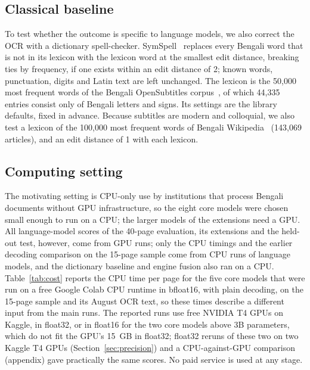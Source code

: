 \documentclass[conference]{IEEEtran}
\begin{document}




\subsection{Classical baseline}
To test whether the outcome is specific to language models, we also correct the OCR with a dictionary spell-checker. SymSpell~\cite{garbe2025symspell} replaces every Bengali word that is not in its lexicon with the lexicon word at the smallest edit distance, breaking ties by frequency, if one exists within an edit distance of 2; known words, punctuation, digits and Latin text are left unchanged. The lexicon is the 50{,}000 most frequent words of the Bengali OpenSubtitles corpus~\cite{dave2018frequencywords}, of which 44{,}335 entries consist only of Bengali letters and signs. Its settings are the library defaults, fixed in advance. Because subtitles are modern and colloquial, we also test a lexicon of the 100{,}000 most frequent words of Bengali Wikipedia~\cite{wikimedia2023wikipedia} (143{,}069 articles), and an edit distance of 1 with each lexicon.

\subsection{Computing setting}
\label{sec:computing}
The motivating setting is CPU-only use by institutions that process Bengali documents without GPU infrastructure, so the eight core models were chosen small enough to run on a CPU; the larger models of the extensions need a GPU. All language-model scores of the 40-page evaluation, its extensions and the held-out test, however, come from GPU runs; only the CPU timings and the earlier decoding comparison on the 15-page sample come from CPU runs of language models, and the dictionary baseline and engine fusion also ran on a CPU. Table~\ref{tab:cost} reports the CPU time per page for the five core models that were run on a free Google Colab CPU runtime in bfloat16, with plain decoding, on the 15-page sample and its August OCR text, so these times describe a different input from the main runs. The reported runs use free NVIDIA T4 GPUs on Kaggle, in float32, or in float16 for the two core models above 3B parameters, which do not fit the GPU's 15~GB in float32; float32 reruns of these two on two Kaggle T4 GPUs (Section~\ref{sec:precision}) and a CPU-against-GPU comparison (appendix) gave practically the same scores. No paid service is used at any stage.
\end{document}
